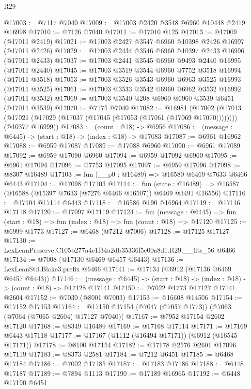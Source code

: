 \begin{lexlean}{R29}
\begin{coremodule}
@17003 := @7117 @7040
@17009 := @17003 @2420 @3548 @6960 @10448 @2419 @16998
@17010 := @7126 @7040
@17011 := @17010 @125
@17013 := @17009 (@17011 @2419)
@17021 := @17003 @2427 @3547 @6960 @10398 @2426 @16997 (@17011 @2426)
@17029 := @17003 @2434 @3546 @6960 @10397 @2433 @16996 (@17011 @2433)
@17037 := @17003 @2441 @3545 @6960 @9493 @2440 @16995 (@17011 @2440)
@17045 := @17003 @3519 @3544 @6960 @7752 @3518 @16994 (@17011 @3518)
@17053 := @17003 @3526 @3543 @6960 @6963 @3525 @16993 (@17011 @3525)
@17061 := @17003 @3533 @3542 @6960 @6962 @3532 @16992 (@17011 @3532)
@17069 := @17003 @3540 @208 @6960 @6960 @3539 @6451 (@17011 @3539)
@17070 := @7175 @7040
@17082 := @16981
    (@17002
      (@17013 (@17021 (@17029 (@17037 (@17045 (@17053 (@17061 (@17069 @17070))))))))
      (@10377 @16999))
@17083 := (count : @18) -> @6956
@17086 := (message : @6445) -> (start : @18) -> (index : @18) -> @17083
@17087 := @6961 @16962
@17088 := @6959 @17087
@17089 := @17088 @6960
@17090 := @6961 @17089
@17092 := @6959 @17090 @6960
@17094 := @6959 @17092 @6960
@17095 := @6961 @17094
@17096 := @7753 @17095
@17097 := @6959 @17096
@17098 := @8307 @16489
@17103 := fun (__p0 : @16489) => @16580 @6469 @7633 @6466 @6443
@17104 := @17098 @17103
@17114 := fun (state : @16489) =>
  @16587 (@16588 (@15397 @7633 (@7276 @6466 @16507)) @6469 @3491 @16556)
@17116 := @17104 @17114 @6443
@17118 := @16586 @190 @16964
@17119 := @17116 @17118
@17120 := @17097 @17119
@17124 := fun (message : @6445) =>
  fun (start : @18) => fun (index : @18) => fun (count : @18) => @17120
@17125 := @6999 @1773
@17127 := @6468 (@7212 @7006)
@17128 := @17125 @17127
@17130 := LexLeanPreserve.C105b277a4c1f34a2db35336f5e00a8d1.R29.__fits_56 @6466
@17134 := @7008 (@17130 @6469 @6457 @6443)
@17136 := LexLeanStd.Blake3.prefix @6466
@17141 := @17134 (@6912 (@17136 @6469 @6457 @6443))
@17146 := (message : @6445) -> (start : @18) -> (index : @18) -> (count : @18) -> @17128 @17141
@17150 := @7022 @1773 @17127 @17141 @2604
@17152 := @7030 (@8001 @7003)
@17153 := @16608 @14506
@17154 := @17152 @17153
@17164 := @17150 @17154 (@7047 (@7057 @1773)) (@7063 (@7064 (@7065 @2604) @17127 @7040))
@17167 := @7952 @17154 @2602 @17120
@17168 := @8349 @16489
@17169 := @17168 @17114
@17171 := @17169 @6443 @17118
@17177 := @17167 (@1112 (@16494 @17171)) (@6912 (@16545 @17171))
@17178 := @8100 @17154
@17182 := @17178 @2576 @2601 @17096 @17119
@17183 := @8373 @2581
@17184 := @7212 @6451
@17185 := @6468 @17184
@17186 := @7002 @17185
@17187 := @17183 @17186
@17188 := @6448 @17187
@17189 := @7894 @1113
@17190 := @17189 @16965
@17192 := @6448 @17190 @6451

\end{coremodule}
\end{lexlean}
